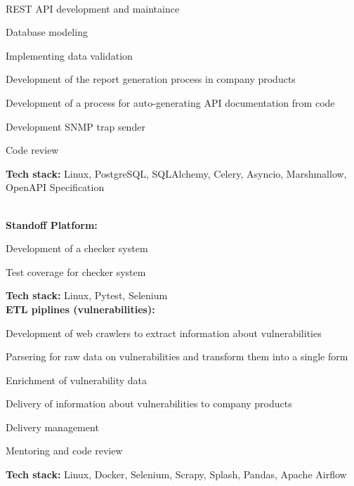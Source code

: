 \documentclass[a4paper]{MagicalCV}
\begin{document}
\hfill
\begin{minipage}[t]{0.64\textwidth} 


 \\
\vspace{\topsep} %
\begin{tightemize}
  \item REST API development and maintaince
  \item Database modeling
  \item Implementing data validation
  \item Development of the report generation process in company products
  \item Development of a process for auto-generating API documentation from code
  \item Development SNMP trap sender
  \item Code review
\end{tightemize}
\textbf{Tech stack:} Linux, PostgreSQL, SQLAlchemy, Celery, Asyncio, Marshmallow, OpenAPI Specification
\sectionsep

 \\
\vspace{\topsep} %
\textbf{Standoff Platform:}
\begin{tightemize}
  \item Development of a checker system
  \item Test coverage for checker system
\end{tightemize}
\textbf{Tech stack:} Linux, Pytest, Selenium
\\
\textbf{ETL piplines (vulnerabilities):}
\begin{tightemize}
  \item Development of web crawlers to extract information about vulnerabilities
  \item Parsering for raw data on vulnerabilities and transform them into a single form
  \item Enrichment of vulnerability data
  \item Delivery of information about vulnerabilities to company products
  \item Delivery management
  \item Mentoring and code review
\end{tightemize}
\textbf{Tech stack:} Linux, Docker, Selenium, Scrapy, Splash, Pandas, Apache Airflow
\sectionsep


\end{minipage} 
\end{document}
